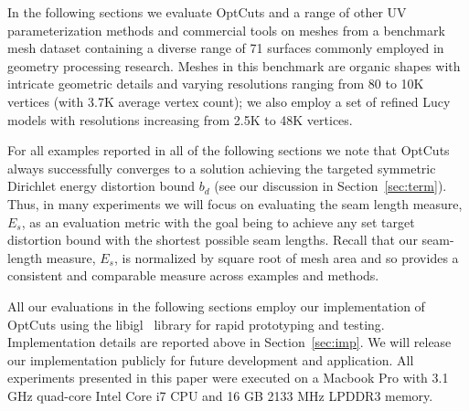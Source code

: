 In the following sections we evaluate OptCuts and a range of other UV parameterization methods and commercial tools on meshes from a benchmark mesh dataset containing a diverse range of 71 surfaces commonly employed in geometry processing research. Meshes in this benchmark are organic shapes with intricate geometric details and varying resolutions ranging from 80 to 10K vertices (with 3.7K average vertex count); we also employ a set of refined Lucy models with resolutions increasing from 2.5K to 48K vertices.

For all examples reported in all of the following sections we note that OptCuts always successfully converges to a solution achieving the targeted symmetric Dirichlet energy distortion bound $b_d$ (see our discussion in Section~\ref{sec:term}). Thus, in many experiments we will focus on evaluating the seam length measure, $E_{s}$, as an evaluation metric with the goal being to achieve any set target distortion bound with the shortest possible seam lengths. Recall that our seam-length measure, $E_{s}$, is normalized by square root of mesh area and so provides a consistent and comparable measure across examples and methods. 

All our evaluations in the following sections employ our implementation of OptCuts using the libigl~\cite{libigl} library for rapid prototyping and testing. Implementation details are reported above in Section~\ref{sec:imp}. We will release our implementation publicly for future development and application. All experiments presented in this paper were executed on a Macbook Pro with 3.1 GHz quad-core Intel Core i7 CPU and 16 GB 2133 MHz LPDDR3 memory.


